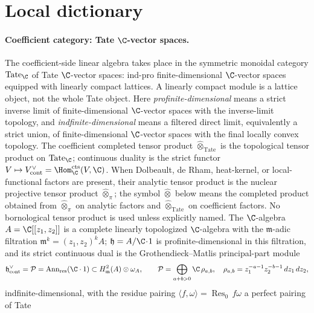 \providecommand{\Prim}{\operatorname{Prim}}
\providecommand{\Conn}{\operatorname{Conn}}

\section*{Local dictionary}

\paragraph{\texorpdfstring{Coefficient category: Tate $\C$-vector spaces.}{Coefficient category: Tate C-vector spaces.}}
The coefficient-side linear algebra takes place in the symmetric
monoidal category $\mathrm{Tate}_\C$ of Tate $\C$-vector spaces:
ind-pro finite-dimensional $\C$-vector spaces equipped with linearly
compact lattices.  A linearly compact module is a lattice object, not
the whole Tate object.  Here \emph{profinite-dimensional} means a
strict inverse limit of finite-dimensional \(\C\)-vector spaces with the
inverse-limit topology, and \emph{indfinite-dimensional} means a
filtered direct limit, equivalently a strict union, of finite-dimensional
\(\C\)-vector spaces with the final locally convex topology.  The
coefficient completed tensor product
$\widehat\otimes_{\mathrm{Tate}}$ is the topological tensor product on
$\mathrm{Tate}_\C$; continuous duality is the strict functor
$V\mapsto V^\vee_{\mathrm{cont}}=\Hom^{\mathrm{cts}}_\C(V,\C)$.  When
Dolbeault, de Rham, heat-kernel, or local-functional factors are
present, their analytic tensor product is the nuclear projective tensor
product \(\widehat\otimes_\pi\); the symbol \(\widehat\otimes\) below
means the completed product obtained from
\(\widehat\otimes_\pi\) on analytic factors and
\(\widehat\otimes_{\mathrm{Tate}}\) on coefficient factors.  No
bornological tensor product is used unless explicitly named.  The
$\C$-algebra $A=\C[[z_1,z_2]]$ is a complete linearly topologized
$\C$-algebra with the $\mathfrak m$-adic filtration
$\mathfrak m^k=(z_1,z_2)^kA$; $\mathfrak h=A/\C\!\cdot\!1$ is
profinite-dimensional in this filtration, and its strict continuous
dual is the Grothendieck--Matlis principal-part module
\[
  \mathfrak h^\vee_{\mathrm{cont}}
  =\mathcal P
  =\operatorname{Ann}_{\mathrm{res}}(\C\cdot1)\subset H^2_{\mathfrak m}(A)\otimes\omega_A,
  \qquad
  \mathcal P=\bigoplus_{a+b>0}\C\,\rho_{a,b},
  \quad
  \rho_{a,b}=z_1^{-a-1}z_2^{-b-1}\,dz_1\,dz_2,
\]
indfinite-dimensional, with the residue pairing
$\langle f,\omega\rangle=\operatorname{Res}_0\,f\omega$ a perfect pairing of Tate
